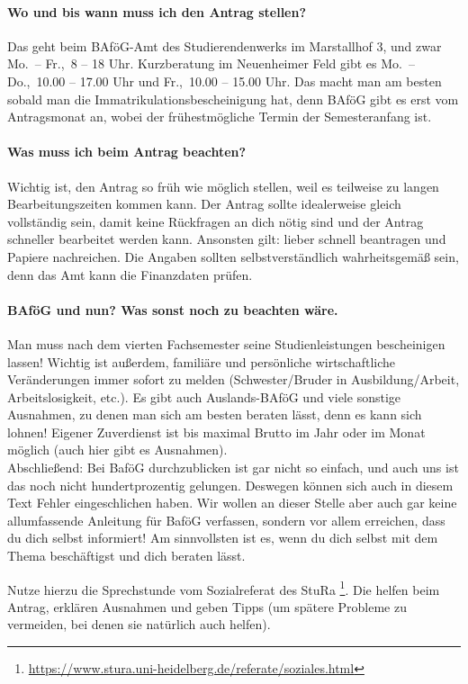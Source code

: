 \paragraph{Wo und bis wann muss ich den Antrag stellen?}
Das geht beim BAföG-Amt des Studierendenwerks im Marstallhof 3, und zwar Mo.\ -- Fr.,\ 8 -- 18 Uhr. Kurzberatung im Neuenheimer Feld gibt es Mo.\ -- Do.,\ 10.00 -- 17.00 Uhr und Fr.,\ 10.00 -- 15.00 Uhr. Das macht man am besten sobald man die Immatrikulationsbescheinigung hat, denn BAföG gibt es erst vom Antragsmonat an, wobei der frühestmögliche Termin der Semesteranfang ist.

\paragraph{Was muss ich beim Antrag beachten?}
Wichtig ist, den Antrag so früh wie möglich stellen, weil es teilweise zu langen Bearbeitungszeiten kommen kann. Der Antrag sollte idealerweise gleich vollständig sein, damit keine Rückfragen an dich nötig sind und der Antrag schneller bearbeitet werden kann. Ansonsten gilt: lieber schnell beantragen und Papiere nachreichen. Die Angaben sollten selbstverständlich wahrheitsgemäß sein, denn das Amt kann die Finanzdaten prüfen.

\paragraph{BAföG und nun? Was sonst noch zu beachten wäre.}
Man muss nach dem vierten Fachsemester seine Studienleistungen bescheinigen lassen! Wichtig ist außerdem,  familiäre und persönliche wirtschaftliche Veränderungen immer sofort zu melden (Schwester/Bruder in Ausbildung/Arbeit, Arbeitslosigkeit, etc.). Es gibt auch Auslands-BAföG und viele sonstige Ausnahmen, zu denen man sich am besten beraten lässt, denn es kann sich lohnen! Eigener Zuverdienst ist bis maximal  Brutto im Jahr oder  im Monat möglich (auch hier gibt es Ausnahmen).\\[5mm]

\noindent Abschließend: Bei BaföG durchzublicken ist gar nicht so einfach, und auch uns ist das noch nicht hundertprozentig gelungen. Deswegen können sich auch in diesem Text Fehler eingeschlichen haben. Wir wollen an dieser Stelle aber auch gar keine allumfassende Anleitung für BaföG verfassen, sondern vor allem erreichen, dass du dich selbst informiert! Am sinnvollsten ist es, wenn du dich selbst mit dem Thema beschäftigst und dich beraten lässt.

Nutze hierzu die Sprechstunde vom Sozialreferat des \gls{StuRa} \footnote{\url{https://www.stura.uni-heidelberg.de/referate/soziales.html}}. Die helfen beim Antrag, erklären Ausnahmen und geben Tipps (um spätere Probleme zu vermeiden, bei denen sie natürlich auch helfen).
